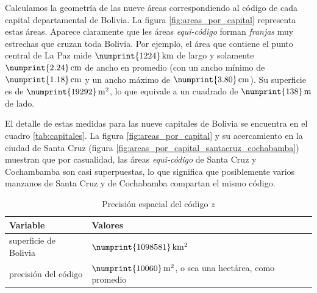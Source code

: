 \documentclass[letterpaper]{article}
\begin{document}
Calculamos la geometría de las nueve áreas correspondiendo al código de cada capital departamental de Bolivia. La figura \ref{fig:areas_por_capital} representa estas áreas. Aparece claramente que les áreas \emph{equi-código} forman \emph{franjas} muy estrechas que cruzan toda Bolivia. Por ejemplo, el área que contiene el punto central de La Paz mide \(\numprint{1224}\,\mathrm{km}\) de largo y solamente \(\numprint{2.24}\,\mathrm{cm}\) de ancho en promedio (con un ancho mínimo de \(\numprint{1.18}\,\mathrm{cm}\) y un ancho máximo de \(\numprint{3.80}\,\mathrm{cm}\)). Su superficie es de \(\numprint{19292}\,\mathrm{m^{2}}\), lo que equivale a un cuadrado de \(\numprint{138}\,\mathrm{m}\) de lado.

El detalle de estas medidas para las nueve capitales de Bolivia se encuentra en el cuadro \ref{tab:capitales}. La figura \ref{fig:areas_por_capital} y su acercamiento en la ciudad de Santa Cruz (figura \ref{fig:areas_por_capital_santacruz_cochabamba}) muestran que por casualidad, las áreas \emph{equi-código} de Santa Cruz y Cochambamba son casi superpuestas, lo que significa que posiblemente varios manzanos de Santa Cruz y de Cochabamba compartan el mismo código.

\begin{table}
	\centering
	\begin{tabular}{|l|l|}
		\hline
		Variable & Valores \\
		\hline
		superficie de Bolivia & \(\numprint{1098581}\,\mathrm{km^{2}}\) \\
		precisión del código & \(\numprint{10060}\,\mathrm{m^{2}}\), o sea una hectárea, como promedio\\
		\hline
	\end{tabular}
	\caption{Precisión espacial del código \(z\)}
	\label{tab:variables}
\end{table}
\end{document}

